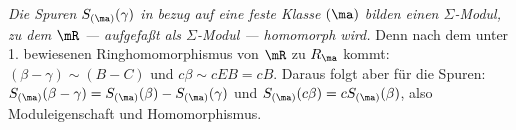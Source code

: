 \emph{Die Spuren $S_{(\ma)}(\gamma)$ in bezug auf eine feste Klasse $(\ma)$ bilden einen $\Sigma$-Modul, zu dem $\mR$ --- aufgefaßt als $\Sigma$-Modul --- homomorph wird.} Denn nach dem unter 1. bewiesenen Ringhomomorphismus von $\mR$ zu $R_\ma$ kommt: $(\beta-\gamma)\sim(B-C)$ und $c\beta\sim cEB=cB$. Daraus folgt aber für die Spuren: $S_{(\ma)}(\beta-\gamma)=S_{(\ma)}(\beta)-S_{(\ma)}(\gamma)$ und $S_{(\ma)}(c\beta)=cS_{(\ma)}(\beta)$, also Moduleigenschaft und Homomorphismus.